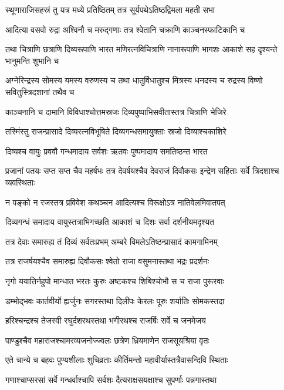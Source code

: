 \twolineshloka
{स्थूणाराजिसहस्रं तु यत्र मध्ये प्रतिष्ठितम्}
{तत्र सूर्यपथेऽतिष्ठद्विमला महती सभा}


\twolineshloka
{आदित्या वसवो रुद्रा अश्विनौ च मरुद्गणाः}
{तत्र श्वेतानि चक्राणि काञ्चनस्फाटिकानि च}


\threelineshloka
{तथा चित्राणि छत्राणि दिव्यरूपाणि भारत}
{मणिरत्नविचित्राणि नानारूपाणि भागशः}
{आकाशे सह दृश्यन्ते भानुमन्ति शुभानि च}


\threelineshloka
{अग्नेरिन्द्रस्य सोमस्य यमस्य वरुणस्य च}
{तथा धातुर्विधातुश्च मित्रस्य धनदस्य च}
{रुद्रस्य विष्णो सवितुस्त्रिदशानां तथैव च}


\twolineshloka
{काञ्चनानि च दामानि विविधाश्चोत्तमस्रजः}
{दिव्यपुष्पाभिसवीतास्तत्र चित्राणि भेजिरे}


\twolineshloka
{तस्मिंस्तु राजन्प्रासादे दिव्यरत्नविभूषिते}
{दिव्यगन्धसमायुक्ताः स्रजो दिव्याश्चकाशिरे}


\twolineshloka
{दिव्यश्च वायुः प्रववौ गन्धमादाय सर्वशः}
{ऋतवः पुष्पमादाय समतिष्ठन्त भारत}


\threelineshloka
{प्रजानां पतयः सप्त सप्त चैव महर्षभः}
{तत्र देवर्षयश्चैव देवराजं दिवौकसः}
{इन्द्रेण सहिताः सर्वे त्रिदशाश्च व्यवस्थिताः}


\twolineshloka
{न पङ्को न रजस्तत्र प्रविवेश कथञ्चन}
{आदित्यश्च विरूक्षोऽत्र नातिवेलमिवातपत्}


\twolineshloka
{दिव्यगन्धं समादाय वायुस्तत्राभिगच्छति}
{आकाशं च दिशः सर्वा दर्शनीयमदृश्यत}


\twolineshloka
{तत्र देवाः समारुह्य तं दिव्यं सर्वतःप्रभम्}
{अम्बरे विमलेऽतिष्ठन्प्रासादं कामगामिनम्}


\twolineshloka
{तत्र राजर्षयश्चैव समारुह्य दिवौकसः}
{श्वेतो राजा वसुमनास्तथा भद्रः प्रदर्शनः}


\twolineshloka
{नृगो ययातिर्नहुपो मान्धात भरतः कुरुः}
{अष्टकश्च शिबिश्चोभौ स च राजा पुरूरवाः}


\twolineshloka
{डम्भोद्भवः कार्तवीर्यो ह्यर्जुनः सगरस्तथा}
{दिलीपः केरलः पूरुः शर्यातिः सोमकस्तदा}


\twolineshloka
{हरिश्चन्द्रश्च तेजस्वी रघुर्दशरथस्तथा}
{भगीरथश्च राजर्षिः सर्वे च जनमेजय}


\twolineshloka
{पाण्डुश्चैव महाराजश्चामरव्यजनोज्ज्वलः}
{छत्रेण ध्रियमाणेन राजसूयश्रिया वृतः}


\twolineshloka
{एते चान्ये च बहवः पुण्यशीलाः शुचिव्रताः}
{कीर्तिमन्तो महावीर्यास्तत्रैवासन्दिवि स्थिताः}


\twolineshloka
{गणाश्चाप्सरसां सर्वे गन्धर्वाश्चापि सर्वशः}
{दैत्यराक्षसयक्षाश्च सुपर्णाः पन्नगास्तथा}


